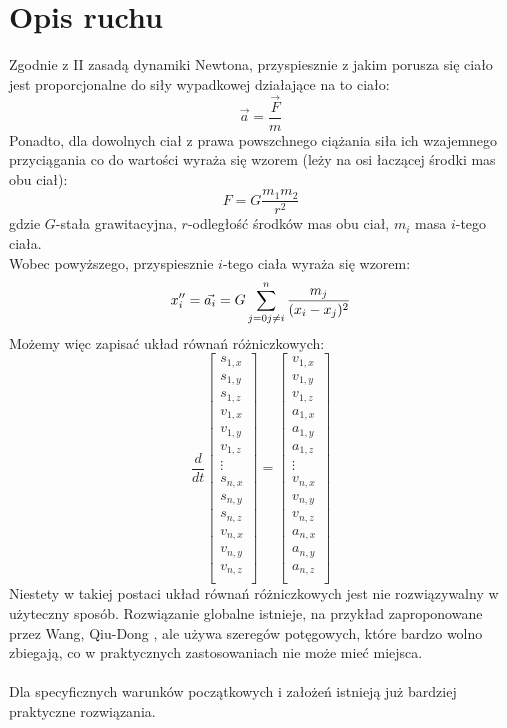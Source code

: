 \documentclass{article}
\begin{document}
\section{Opis ruchu}
Zgodnie z II zasadą dynamiki Newtona, przyspiesznie z jakim porusza się ciało jest proporcjonalne do siły wypadkowej działające na to ciało:
\begin{equation}
\vec{a} = \frac{\vec{F}} m
\end{equation}
Ponadto, dla dowolnych ciał z prawa powszchnego ciążania siła ich wzajemnego przyciągania co do wartości wyraża się wzorem (leży na osi łaczącej środki mas obu ciał):
\begin{equation}
F = G\frac{m_1m_2}{r^2}
\end{equation}
gdzie $G$-stała grawitacyjna, $r$-odległość środków mas obu ciał, $m_i$ masa $i$-tego ciała.\\
Wobec powyższego, przyspiesznie $i$-tego ciała wyraża się wzorem:
\begin{equation}
x_i'' = \vec{a_i} = G\sum_{j=0\\j\neq i}^n \frac{m_j}{(x_i-x_j)^2}
\end{equation}
Możemy więc zapisać układ równań różniczkowych:
\begin{equation}
\frac{d}{dt}
\begin{bmatrix}
s_{1,x}\\
s_{1,y}\\
s_{1,z}\\
v_{1,x}\\
v_{1,y}\\
v_{1,z}\\
\vdots\\
s_{n,x}\\
s_{n,y}\\
s_{n,z}\\
v_{n,x}\\
v_{n,y}\\
v_{n,z}\\
\end{bmatrix}=
\begin{bmatrix}
v_{1,x}\\
v_{1,y}\\
v_{1,z}\\
a_{1,x}\\
a_{1,y}\\
a_{1,z}\\
\vdots\\
v_{n,x}\\
v_{n,y}\\
v_{n,z}\\
a_{n,x}\\
a_{n,y}\\
a_{n,z}\\
\end{bmatrix}
\end{equation}
Niestety w takiej postaci układ równań różniczkowych jest nie rozwiązywalny w użyteczny sposób. Rozwiązanie globalne istnieje, na przykład zaproponowane przez Wang, Qiu-Dong \cite{wang}, ale używa szeregów potęgowych, które bardzo wolno zbiegają, co w praktycznych zastosowaniach nie może mieć miejsca.\\\\
Dla specyficznych warunków początkowych i założeń istnieją już bardziej praktyczne rozwiązania.
\clearpage
\end{document}
